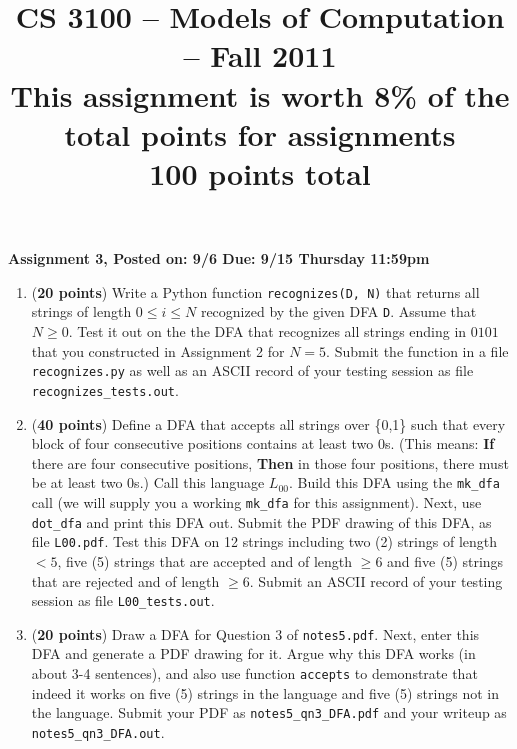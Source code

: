 \documentclass{article}
\begin{document}
\title{\large\bf CS 3100 -- Models of Computation -- Fall 2011 \\
 This assignment is worth 8\% of the total points for assignments \\
 100 points total}

\maketitle

\begin{center}
{\bf Assignment 3, Posted on: 9/6  Due: 9/15 {\bf Thursday} 11:59pm}
\end{center}

\thispagestyle{empty}

\begin{enumerate}

\item ({\bf 20 points})\label{q1}
  Write a Python function \verb|recognizes(D, N)| that returns
  all strings of length $0 \leq i \leq N$  recognized by the given DFA {\tt D}.
  Assume that $N \geq 0$.
  Test it out on the the DFA that recognizes all strings ending in 
  $0101$ that you constructed in Assignment 2 for $N=5$.
  Submit the function in a file {\tt recognizes.py} as well as
  an ASCII record of your testing session 
  as file \verb|recognizes_tests.out|.

\item ({\bf 40 points}) \label{q2}
 Define a DFA that accepts all strings over \{0,1\} 
  such that every block of four consecutive positions contains at 
  least two 0s.
  (This means: {\bf If} there are four consecutive positions, {\bf Then} in those
  four positions, there must be at least two 0s.)
  Call this language $L_{00}$.
  Build this DFA using the \verb|mk_dfa| call (we will supply you
  a working \verb|mk_dfa| for this assignment).
  Next, use \verb|dot_dfa| and print this DFA out.
  Submit the PDF drawing of this DFA, as file {\tt L00.pdf}.
  Test this DFA on 12 strings
  including two (2) strings of length $< 5$, 
  five (5) strings that are accepted and of length $\ge 6$
and
  five (5) strings that are rejected and of length $\ge 6$.
  Submit an ASCII record of your testing session
  as file \verb|L00_tests.out|.

\item ({\bf 20 points}) Draw a DFA for Question 3 of {\tt notes5.pdf}.
  Next, enter this DFA and generate a PDF drawing for it. Argue why
  this DFA works (in about 3-4 sentences), and also use function
  \verb|accepts| to demonstrate that indeed it works on five (5) 
  strings in the language and five (5) strings not in the language.
  Submit your PDF as \verb|notes5_qn3_DFA.pdf|
  and your writeup as \verb|notes5_qn3_DFA.out|.
  

\end{enumerate}
\end{document}
